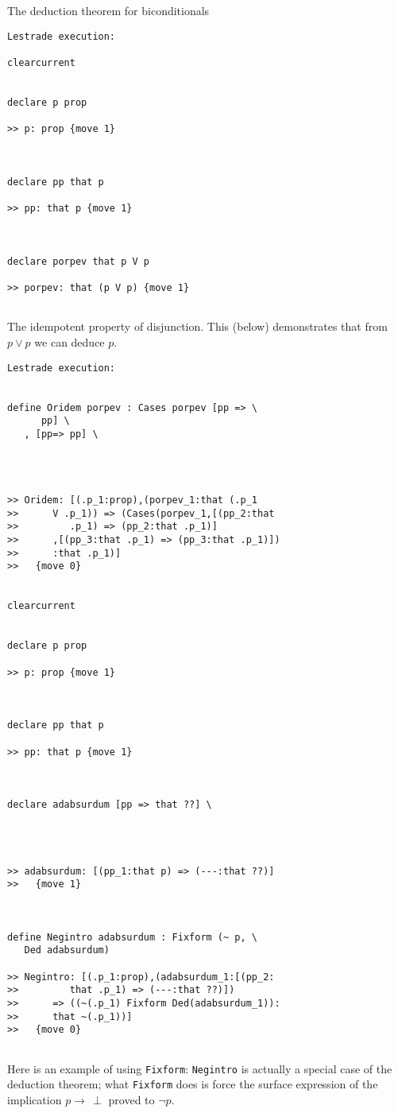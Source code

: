 \documentclass[12pt]{article}
\begin{document}
The deduction theorem for biconditionals

\begin{verbatim}Lestrade execution:

clearcurrent


declare p prop

>> p: prop {move 1}



declare pp that p

>> pp: that p {move 1}



declare porpev that p V p

>> porpev: that (p V p) {move 1}


\end{verbatim}

The idempotent property of disjunction.  This (below) demonstrates that from $p \vee p$ we can deduce $p$.

\begin{verbatim}Lestrade execution:


define Oridem porpev : Cases porpev [pp => \
      pp] \
   , [pp=> pp] \
   



>> Oridem: [(.p_1:prop),(porpev_1:that (.p_1
>>      V .p_1)) => (Cases(porpev_1,[(pp_2:that
>>         .p_1) => (pp_2:that .p_1)]
>>      ,[(pp_3:that .p_1) => (pp_3:that .p_1)])
>>      :that .p_1)]
>>   {move 0}


clearcurrent


declare p prop

>> p: prop {move 1}



declare pp that p

>> pp: that p {move 1}



declare adabsurdum [pp => that ??] \
   



>> adabsurdum: [(pp_1:that p) => (---:that ??)]
>>   {move 1}



define Negintro adabsurdum : Fixform (~ p, \
   Ded adabsurdum)

>> Negintro: [(.p_1:prop),(adabsurdum_1:[(pp_2:
>>         that .p_1) => (---:that ??)])
>>      => ((~(.p_1) Fixform Ded(adabsurdum_1)):
>>      that ~(.p_1))]
>>   {move 0}


\end{verbatim}


Here is an example of using {\tt Fixform}:  {\tt Negintro} is actually a special case of the deduction theorem;  what {\tt Fixform} does is force the surface expression of the implication
$p \rightarrow \, \perp$ proved to $\neg p$.
\end{document}
